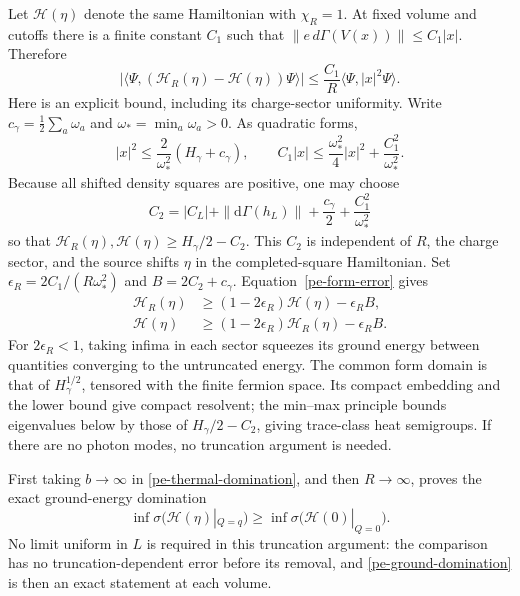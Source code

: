 Let \(\mathcal H(\eta)\) denote the same Hamiltonian with
\(\chi_R=1\). At fixed volume and cutoffs there is a finite constant
\(C_1\) such that
\(\|e\,d\Gamma(V(x))\|\le C_1|x|\). Therefore
\begin{equation}
|\langle\Psi,(\mathcal H_R(\eta)-\mathcal H(\eta))\Psi\rangle|
\le\frac{C_1}{R}\langle\Psi,|x|^2\Psi\rangle.
\label{pe-form-error}
\end{equation}
Here is an explicit bound, including its charge-sector uniformity.
Write \(c_\gamma=\frac12\sum_a\omega_a\) and
\(\omega_*=\min_a\omega_a>0\). As quadratic forms,
\[
|x|^2\le\frac2{\omega_*^2}(H_\gamma+c_\gamma),\qquad
C_1|x|\le\frac{\omega_*^2}{4}|x|^2+\frac{C_1^2}{\omega_*^2}.
\]
Because all shifted density squares are positive, one may choose
\[
C_2=|C_L|+\|\mathrm d\Gamma(h_L)\|
+\frac{c_\gamma}{2}+\frac{C_1^2}{\omega_*^2}
\]
so that
\(\mathcal H_R(\eta),\mathcal H(\eta)\ge H_\gamma/2-C_2\).
This \(C_2\) is independent of \(R\), the charge sector, and the
source shifts \(\eta\) in the completed-square Hamiltonian.
Set \(\epsilon_R=2C_1/(R\omega_*^2)\) and
\(B=2C_2+c_\gamma\). Equation~\eqref{pe-form-error} gives
\begin{align}
\mathcal H_R(\eta)&\ge(1-2\epsilon_R)\mathcal H(\eta)-\epsilon_R B,\\
\mathcal H(\eta)&\ge(1-2\epsilon_R)\mathcal H_R(\eta)-\epsilon_R B.
\label{pe-explicit-squeeze}
\end{align}
For \(2\epsilon_R<1\), taking infima in each sector squeezes its
ground energy between quantities converging to the untruncated energy.
The common form domain is that of \(H_\gamma^{1/2}\), tensored with
the finite fermion space. Its compact embedding and the lower bound
give compact resolvent; the min--max principle bounds eigenvalues below
by those of \(H_\gamma/2-C_2\), giving trace-class heat semigroups.
If there are no photon modes, no truncation argument is needed.

First taking \(b\to\infty\) in \eqref{pe-thermal-domination}, and
then \(R\to\infty\), proves the exact ground-energy domination
\begin{equation}
\inf\sigma\bigl(\mathcal H(\eta)|_{Q=q}\bigr)
\ge\inf\sigma\bigl(\mathcal H(0)|_{Q=0}\bigr).
\label{pe-ground-domination}
\end{equation}
No limit uniform in \(L\) is required in this truncation argument:
the comparison has no truncation-dependent error before its removal,
and \eqref{pe-ground-domination} is then an exact statement at each
volume.

